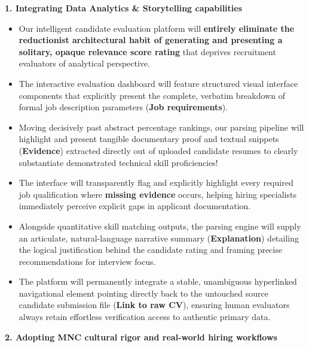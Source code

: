\vspace{0.5em}\noindent\textbf{1. Integrating Data Analytics \& Storytelling
capabilities}\par

\begin{itemize}
\tightlist
\item
  Our intelligent candidate evaluation platform will \textbf{entirely
  eliminate the reductionist architectural habit of generating and
  presenting a solitary, opaque relevance score rating} that deprives
  recruitment evaluators of analytical perspective.
\item
  The interactive evaluation dashboard will feature structured visual
  interface components that explicitly present the complete, verbatim
  breakdown of formal job description parameters (\textbf{Job
  requirements}).
\item
  Moving decisively past abstract percentage rankings, our parsing
  pipeline will highlight and present tangible documentary proof and
  textual snippets (\textbf{Evidence}) extracted directly out of
  uploaded candidate resumes to clearly substantiate demonstrated
  technical skill proficiencies!
\item
  The interface will transparently flag and explicitly highlight every
  required job qualification where \textbf{missing evidence} occurs,
  helping hiring specialists immediately perceive explicit gaps in
  applicant documentation.
\item
  Alongside quantitative skill matching outputs, the parsing engine will
  supply an articulate, natural-language narrative summary
  (\textbf{Explanation}) detailing the logical justification behind the
  candidate rating and framing precise recommendations for interview
  focus.
\item
  The platform will permanently integrate a stable, unambiguous
  hyperlinked navigational element pointing directly back to the
  untouched source candidate submission file (\textbf{Link to raw CV}),
  ensuring human evaluators always retain effortless verification access
  to authentic primary data.
\end{itemize}

\vspace{0.5em}\noindent\textbf{2. Adopting MNC cultural rigor and real-world hiring
workflows}\par

